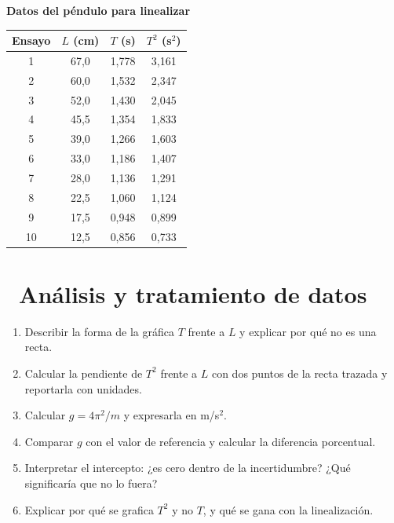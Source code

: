 \documentclass[11pt,a4paper]{article}
\newcommand{\iconotexto}[2]{\textcolor{cyanNeon}{\faIcon{#1}}~#2}
\begin{document}
\begin{center}
\begin{minipage}{\linewidth}
\centering
{\small
\textbf{Datos del péndulo para linealizar}\par\smallskip
\begin{tabular}{@{}cccc@{}}
\toprule
Ensayo & $L$ (cm) & $T$ (s) & $T^2$ (s$^2$) \\
\midrule
1 & 67,0 & 1,778 & 3,161 \\
2 & 60,0 & 1,532 & 2,347 \\
3 & 52,0 & 1,430 & 2,045 \\
4 & 45,5 & 1,354 & 1,833 \\
5 & 39,0 & 1,266 & 1,603 \\
6 & 33,0 & 1,186 & 1,407 \\
7 & 28,0 & 1,136 & 1,291 \\
8 & 22,5 & 1,060 & 1,124 \\
9 & 17,5 & 0,948 & 0,899 \\
10 & 12,5 & 0,856 & 0,733 \\
\bottomrule
\end{tabular}
}\par{}
\end{minipage}
\end{center}

\section{\iconotexto{calculator}{Análisis y tratamiento de datos}}

\begin{enumerate}[leftmargin=1.4em,itemsep=2pt,topsep=3pt]
  \item Describir la forma de la gráfica $T$ frente a $L$ y explicar por qué no es una recta.
  \item Calcular la pendiente de $T^2$ frente a $L$ con dos puntos de la recta trazada y reportarla con unidades.
  \item Calcular $g = 4\pi^2/m$ y expresarla en m/s$^2$.
  \item Comparar $g$ con el valor de referencia y calcular la diferencia porcentual.
  \item Interpretar el intercepto: ¿es cero dentro de la incertidumbre? ¿Qué significaría que no lo fuera?
  \item Explicar por qué se grafica $T^2$ y no $T$, y qué se gana con la linealización.
\end{enumerate}
\end{document}
